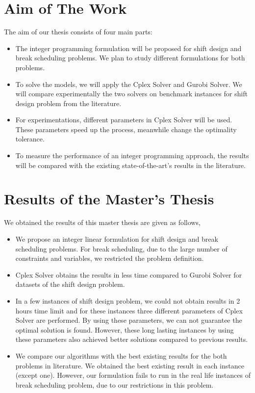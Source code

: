 \section{Aim of The Work}

The aim of our thesis consists of four main parts:

\begin{itemize}

\item The integer programming formulation will be proposed for shift design and break scheduling problems. We plan to study different formulations for both problems.

\item To solve the models, we will apply the Cplex Solver and Gurobi Solver. We will compare experimentally the two solvers on benchmark instances for shift design problem from the literature.

\item For experimentations, different parameters in Cplex Solver will be used. These parameters speed up the process, meanwhile change the optimality tolerance.

\item To measure the performance of an integer programming approach, the results will be compared with the existing state-of-the-art's results in the literature. 
\end{itemize}

\section{Results of the Master's Thesis}

We obtained the results of this master thesis are given as follows,

\begin{itemize}

\item We propose an integer linear formulation for shift design and break scheduling problems. For break scheduling, due to the large number of constraints and variables, we restricted the problem definition.

\item Cplex Solver obtains the results in less time compared to Gurobi Solver for datasets of the shift design problem.

\item In a few instances of shift design problem, we could not obtain results in 2 hours time limit and for these instances three different parameters of Cplex Solver are performed. By using these parameters, we can not guarantee the optimal solution is found. However, these long lasting instances by using these parameters also achieved better solutions compared to previous results. 

\item We compare our algorithms with the best existing results for the both problems in literature. We obtained the best existing result in each instance (except one). However, our formulation fails to run in the real life instances of break scheduling problem, due to our restrictions in this problem.
\end{itemize}


